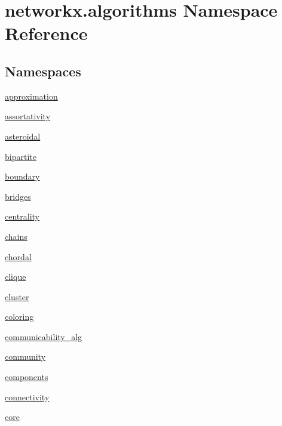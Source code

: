 \hypertarget{namespacenetworkx_1_1algorithms}{}\section{networkx.\+algorithms Namespace Reference}
\label{namespacenetworkx_1_1algorithms}
\subsection*{Namespaces}
\begin{DoxyCompactItemize}
\item 
 \hyperlink{namespacenetworkx_1_1algorithms_1_1approximation}{approximation}
\item 
 \hyperlink{namespacenetworkx_1_1algorithms_1_1assortativity}{assortativity}
\item 
 \hyperlink{namespacenetworkx_1_1algorithms_1_1asteroidal}{asteroidal}
\item 
 \hyperlink{namespacenetworkx_1_1algorithms_1_1bipartite}{bipartite}
\item 
 \hyperlink{namespacenetworkx_1_1algorithms_1_1boundary}{boundary}
\item 
 \hyperlink{namespacenetworkx_1_1algorithms_1_1bridges}{bridges}
\item 
 \hyperlink{namespacenetworkx_1_1algorithms_1_1centrality}{centrality}
\item 
 \hyperlink{namespacenetworkx_1_1algorithms_1_1chains}{chains}
\item 
 \hyperlink{namespacenetworkx_1_1algorithms_1_1chordal}{chordal}
\item 
 \hyperlink{namespacenetworkx_1_1algorithms_1_1clique}{clique}
\item 
 \hyperlink{namespacenetworkx_1_1algorithms_1_1cluster}{cluster}
\item 
 \hyperlink{namespacenetworkx_1_1algorithms_1_1coloring}{coloring}
\item 
 \hyperlink{namespacenetworkx_1_1algorithms_1_1communicability__alg}{communicability\+\_\+alg}
\item 
 \hyperlink{namespacenetworkx_1_1algorithms_1_1community}{community}
\item 
 \hyperlink{namespacenetworkx_1_1algorithms_1_1components}{components}
\item 
 \hyperlink{namespacenetworkx_1_1algorithms_1_1connectivity}{connectivity}
\item 
 \hyperlink{namespacenetworkx_1_1algorithms_1_1core}{core}
\item 

\end{DoxyCompactItemize}

